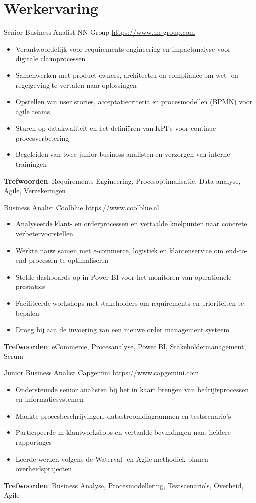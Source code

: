 \documentclass[a4paper, serif, 10pt]{moderncv}
\begin{document}
\section{Werkervaring}

        {Senior Business Analist}
        {NN Group}
        {\url{https://www.nn-group.com}}
        {}
        {\begin{itemize}
\item Verantwoordelijk voor requirements engineering en impactanalyse voor digitale claimprocessen
\item Samenwerken met product owners, architecten en compliance om wet- en regelgeving te vertalen naar oplossingen
\item Opstellen van user stories, acceptatiecriteria en procesmodellen (BPMN) voor agile teams
\item Sturen op datakwaliteit en het definiëren van KPI's voor continue procesverbetering
\item Begeleiden van twee junior business analisten en verzorgen van interne trainingen
\end{itemize}
\textbf{Trefwoorden}: Requirements Engineering, Procesoptimalisatie, Data-analyse, Agile, Verzekeringen}

        {Business Analist}
        {Coolblue}
        {\url{https://www.coolblue.nl}}
        {}
        {\begin{itemize}
\item Analyseerde klant- en orderprocessen en vertaalde knelpunten naar concrete verbetervoorstellen
\item Werkte nauw samen met e-commerce, logistiek en klantenservice om end-to-end processen te optimaliseren
\item Stelde dashboards op in Power BI voor het monitoren van operationele prestaties
\item Faciliteerde workshops met stakeholders om requirements en prioriteiten te bepalen
\item Droeg bij aan de invoering van een nieuwe order management systeem
\end{itemize}
\textbf{Trefwoorden}: eCommerce, Procesanalyse, Power BI, Stakeholdermanagement, Scrum}

        {Junior Business Analist}
        {Capgemini}
        {\url{https://www.capgemini.com}}
        {}
        {\begin{itemize}
\item Ondersteunde senior analisten bij het in kaart brengen van bedrijfsprocessen en informatiesystemen
\item Maakte procesbeschrijvingen, datastroomdiagrammen en testscenario's
\item Participeerde in klantworkshops en vertaalde bevindingen naar heldere rapportages
\item Leerde werken volgens de Waterval- en Agile-methodiek binnen overheidsprojecten
\end{itemize}
\textbf{Trefwoorden}: Business Analyse, Procesmodellering, Testscenario's, Overheid, Agile}
\end{document}
